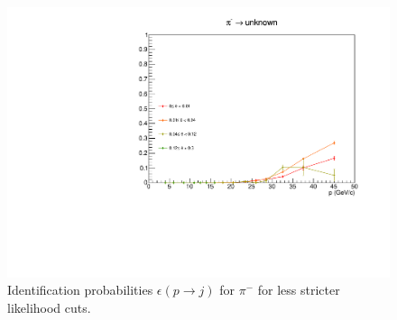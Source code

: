 \begin{figure}[!p]
  \includegraphics[scale=0.38]{./gfx/pim_u_less.pdf}
	\caption{Identification probabilities $\epsilon(p \rightarrow j)$ for $\pi^-$ for less stricter likelihood cuts.}
	\label{pic:Effpimless}
\end{figure}

